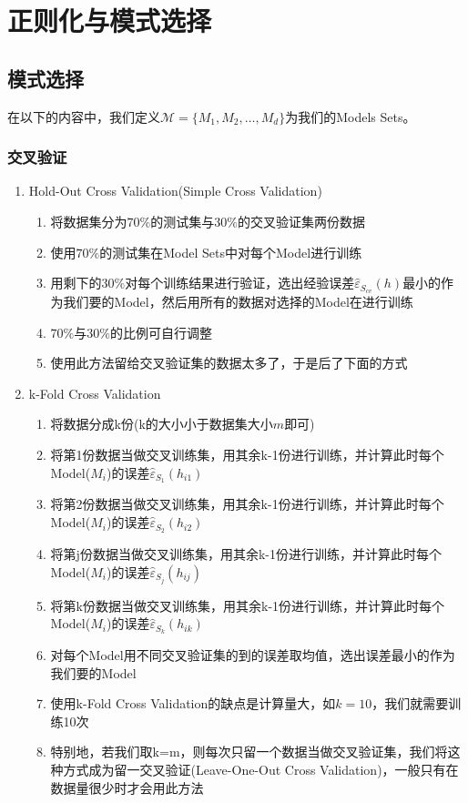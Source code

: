 \section{正则化与模式选择}
\subsection{模式选择}
在以下的内容中，我们定义$\mathcal{M} = \{M_1, M_2, \dots, M_d\}$为我们的Models Sets。

\subsubsection{交叉验证}
\begin{enumerate}
	\item Hold-Out Cross Validation(Simple Cross Validation)
	\begin{enumerate}
		\item 将数据集分为$70\%$的测试集与$30\%$的交叉验证集两份数据
		\item 使用$70\%$的测试集在Model Sets中对每个Model进行训练
		\item 用剩下的$30\%$对每个训练结果进行验证，选出经验误差$\hat{\varepsilon}_{S_{cv}}(h)$最小的作为我们要的Model，然后用所有的数据对选择的Model在进行训练
		\item $70\%$与$30\%$的比例可自行调整
		\item 使用此方法留给交叉验证集的数据太多了，于是后了下面的方式
	\end{enumerate}

	\item k-Fold Cross Validation
	\begin{enumerate}
		\item 将数据分成k份(k的大小小于数据集大小$m$即可)
		\item 将第1份数据当做交叉训练集，用其余k-1份进行训练，并计算此时每个Model($M_i$)的误差$\hat{\varepsilon}_{S_1}(h_{i1})$
		\item 将第2份数据当做交叉训练集，用其余k-1份进行训练，并计算此时每个Model($M_i$)的误差$\hat{\varepsilon}_{S_2}(h_{i2})$
		\item 将第j份数据当做交叉训练集，用其余k-1份进行训练，并计算此时每个Model($M_i$)的误差$\hat{\varepsilon}_{S_j}(h_{ij})$
		\item 将第k份数据当做交叉训练集，用其余k-1份进行训练，并计算此时每个Model($M_i$)的误差$\hat{\varepsilon}_{S_k}(h_{ik})$
		\item 对每个Model用不同交叉验证集的到的误差取均值，选出误差最小的作为我们要的Model
		\item 使用k-Fold Cross Validation的缺点是计算量大，如$k=10$，我们就需要训练10次
		\item 特别地，若我们取k=m，则每次只留一个数据当做交叉验证集，我们将这种方式成为留一交叉验证(Leave-One-Out Cross Validation)，一般只有在数据量很少时才会用此方法

	\end{enumerate}
\end{enumerate}


